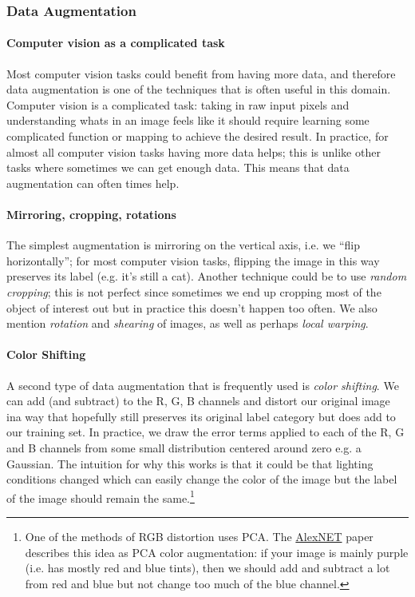 \documentclass[12pt]{article}
\begin{document}
\subsubsection{Data Augmentation}
\paragraph{Computer vision as a complicated task}
Most computer vision tasks could benefit from having more data, and therefore data augmentation is one of the techniques that is often useful in this domain. Computer vision is a complicated task: taking in raw input pixels and understanding whats in an image feels like it should require learning some complicated function or mapping to achieve the desired result. In practice, for almost all computer vision tasks having more data helps; this is unlike other tasks where sometimes we can get enough data.
This means that data augmentation can often times help.

\paragraph{Mirroring, cropping, rotations}
The simplest augmentation is mirroring on the vertical axis, i.e. we ``flip horizontally''; for most computer vision tasks, flipping the image in this way
preserves its label (e.g. it's still a cat). Another technique could be to use \emph{random cropping}; this is not perfect since sometimes we end up cropping most of the object of interest out but in practice this doesn't happen too often. We also mention \emph{rotation} and \emph{shearing} of images, as well as perhaps \emph{local warping}.

\paragraph{Color Shifting}
A second type of data augmentation that is frequently used is \emph{color shifting}. We can add (and subtract) to the R, G, B channels and distort our original image ina way that hopefully still preserves its original label category but does add to our training set. In practice, we draw the error terms applied to each of the R, G and B channels from some small distribution centered around zero e.g. a Gaussian. The intuition for why this works is that it could be that lighting conditions changed which can easily change the color of the image but the label of the image should remain the same.\footnote{One of the methods of RGB distortion uses PCA. The \href{https://papers.nips.cc/paper/4824-imagenet-classification-with-deep-convolutional-neural-networks.pdf}{AlexNET} paper describes this idea as PCA color augmentation: if your image is mainly purple (i.e. has mostly red and blue tints), then we should add and subtract a lot from red and blue but not change too much of the blue channel.}
\end{document}
